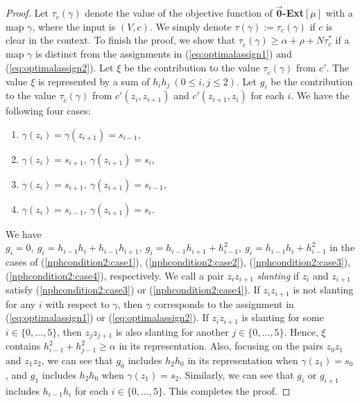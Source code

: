 \documentclass[11pt]{article}
\theoremstyle{definition}
\begin{document}
\begin{proof}
Let $\tau_{c}(\gamma)$ denote the value of the objective function of $\overrightarrow{\textbf{0}}$\textbf{-Ext}$[\mu]$ with a map $\gamma$, where the input is $(V,c)$. We simply denote $\tau(\gamma):=\tau_c(\gamma)$ if $c$ is clear in the context. To finish the proof, we show that $\tau_{\tilde{c}}(\gamma)\geq \alpha+\rho+N\tau_c^*$ if a map $\gamma$ is distinct from the assignments in (\ref{eq:optimalassign1}) and (\ref{eq:optimalassign2}). Let $\xi$ be the contribution to the value $\tau_{\tilde{c}}(\gamma)$ from $c'$. The value $\xi$ is represented by a sum of $h_ih_j\ (0\leq i,j\leq 2)$. Let $g_i$ be the contribution to the value $\tau_{\tilde{c}}(\gamma)$ from $c'(z_i,z_{i+1})$ and $c'(z_{i+1},z_i)$ for each $i$. We have the following four cases:
\begin{enumerate}[label=(\roman*),ref=\roman*]
    \item $\gamma(z_{i})=\gamma(z_{i+1})=s_{i-1}$,
    \label{nphcondition2:case1}
    \item $\gamma(z_{i})=s_{i+1},\ \gamma(z_{i+1})=s_{i}$,
    \label{nphcondition2:case2}
    \item $\gamma(z_{i})=s_{i+1},\ \gamma(z_{i+1})=s_{i-1}$,
    \label{nphcondition2:case3}
    \item $\gamma(z_{i})=s_{i-1},\ \gamma(z_{i+1})=s_{i}$.
    \label{nphcondition2:case4}
\end{enumerate}
We have $g_i=0,\ g_i=h_{i-1}h_{i}+h_{i-1}h_{i+1},\ g_i=h_{i-1}h_{i+1}+h_{i-1}^2,\ g_i=h_{i-1}h_i+h_{i-1}^2$ in the cases of (\ref{nphcondition2:case1}), (\ref{nphcondition2:case2}), (\ref{nphcondition2:case3}), (\ref{nphcondition2:case4}), respectively. We call a pair $z_iz_{i+1}$ \textit{slanting} if $z_i$ and $z_{i+1}$ satisfy (\ref{nphcondition2:case3}) or (\ref{nphcondition2:case4}). If $z_{i}z_{i+1}$ is not slanting for any $i$ with respect to $\gamma$, then $\gamma$ corresponds to the assignment in (\ref{eq:optimalassign1}) or (\ref{eq:optimalassign2}). If $z_iz_{i+1}$ is slanting for some $i\in\{0,\ldots,5\}$, then $z_jz_{j+1}$ is also slanting for another $j\in \{0,\ldots,5\}$. Hence, $\xi$ contains $h_{i-1}^2+h_{j-1}^2\geq \alpha$ in its representation. Also, focusing on the pairs $z_0z_1$ and $z_1z_2$, we can see that $g_0$ includes $h_2h_0$ in its representation when $\gamma(z_1)=s_0$, and $g_1$ includes $h_2h_0$ when $\gamma(z_1)=s_2$. Similarly, we can see that $g_i$ or $g_{i+1}$ includes $h_{i-1}h_i$ for each $i\in \{0,\ldots,5\}$. This completes the proof.
\end{proof}
\end{document}
